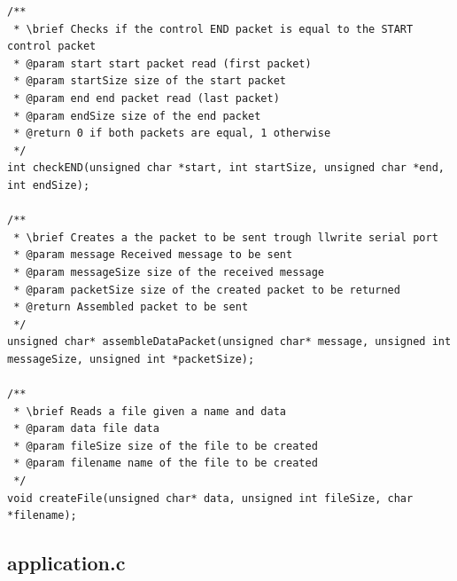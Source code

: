 \documentclass{article}
\begin{document}
\begin{lstlisting}[style=CStyle]
/**
 * \brief Checks if the control END packet is equal to the START control packet
 * @param start start packet read (first packet)
 * @param startSize size of the start packet
 * @param end end packet read (last packet)
 * @param endSize size of the end packet
 * @return 0 if both packets are equal, 1 otherwise
 */
int checkEND(unsigned char *start, int startSize, unsigned char *end, int endSize);

/**
 * \brief Creates a the packet to be sent trough llwrite serial port
 * @param message Received message to be sent
 * @param messageSize size of the received message
 * @param packetSize size of the created packet to be returned
 * @return Assembled packet to be sent
 */
unsigned char* assembleDataPacket(unsigned char* message, unsigned int messageSize, unsigned int *packetSize);

/**
 * \brief Reads a file given a name and data
 * @param data file data
 * @param fileSize size of the file to be created
 * @param filename name of the file to be created
 */
void createFile(unsigned char* data, unsigned int fileSize, char *filename);
\end{lstlisting}

\subsection{application.c}
\end{document}
